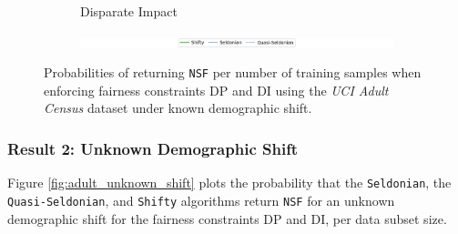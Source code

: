 \begin{figure}[ht]
\begin{subfigure}{0.5\linewidth}
      \caption{Disparate Impact}
      \label{fig:adult_k_di}
    \end{subfigure}
    \begin{subfigure}{\textwidth}
    \includegraphics[width=\linewidth]{figures/iclr_legend.png}
    \end{subfigure}
    \caption{Probabilities of returning \texttt{NSF} per number of training samples when enforcing fairness constraints DP and DI using the \textit{UCI Adult Census} dataset under known demographic shift.}
    \label{fig:adult_known_shift}
\end{figure}

\subsubsection{Result 2: Unknown Demographic Shift}\label{sec:results2}
Figure \ref{fig:adult_unknown_shift} plots the probability that the \texttt{Seldonian}, the \texttt{Quasi-Seldonian}, and \texttt{Shifty} algorithms return \texttt{NSF} for an unknown demographic shift for the fairness constraints DP and DI, per data subset size.

